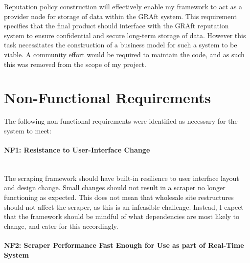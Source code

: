 \noindent Reputation policy construction will effectively enable my framework to act as a provider node for storage of data within the GRAft system. This requirement specifies that the final product should interface with the GRAft reputation system to ensure confidential and secure long-term storage of data. However this task necessitates the construction of a business model for such a system to be viable. A community effort would be required to maintain the code, and as such this was removed from the scope of my project. 


\section{Non-Functional Requirements}

The following non-functional requirements were identified as necessary for the system to meet:


\paragraph{NF1: Resistance to User-Interface Change}\hspace{0pt} \\

\noindent The scraping framework should have built-in resilience to user interface layout and design change. Small changes should not result in a scraper no longer functioning as expected. This does not mean that wholesale site restructures should not affect the scraper, as this is an infeasible challenge. Instead, I expect that the framework should be mindful of what dependencies are most likely to change, and cater for this accordingly. 




\paragraph{NF2: Scraper Performance Fast Enough for Use as part of Real-Time System}\hspace{0pt} \\

